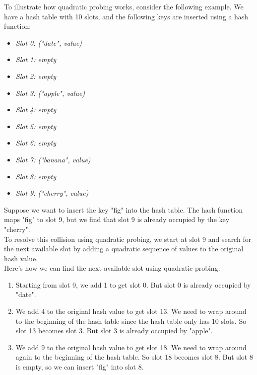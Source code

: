 \documentclass[11pt]{article}
\begin{document}
\begin{enumerate}
          To illustrate how quadratic probing works, consider the following example. We have a hash table with 10 slots, and the following keys are inserted using a hash function:

          \begin{itemize}
              \item \textit{Slot 0: ("date", value)}
              \item \textit{Slot 1: empty}
              \item \textit{Slot 2: empty}
              \item \textit{Slot 3: ("apple", value)}
              \item \textit{Slot 4: empty}
              \item \textit{Slot 5: empty}
              \item \textit{Slot 6: empty}
              \item \textit{Slot 7: ("banana", value)}
              \item \textit{Slot 8: empty}
              \item \textit{Slot 9: ("cherry", value)}
          \end{itemize}

          Suppose we want to insert the key "fig" into the hash table. The hash function maps "fig" to slot 9, but we find that slot 9 is already occupied by the key "cherry". \\To resolve this collision using quadratic probing, we start at slot 9 and search for the next available slot by adding a quadratic sequence of values to the original hash value.\\

          Here's how we can find the next available slot using quadratic probing:

          \begin{enumerate}
              \item Starting from slot 9, we add 1 to get slot 0. But slot 0 is already occupied by "date".
              \item We add 4 to the original hash value to get slot 13. We need to wrap around to the beginning of the hash table since the hash table only has 10 slots. So slot 13 becomes slot 3. But slot 3 is already occupied by "apple".
              \item We add 9 to the original hash value to get slot 18. We need to wrap around again to the beginning of the hash table. So slot 18 becomes slot 8. But slot 8 is empty, so we can insert "fig" into slot 8.
          \end{enumerate}


\end{enumerate}
\end{document}
